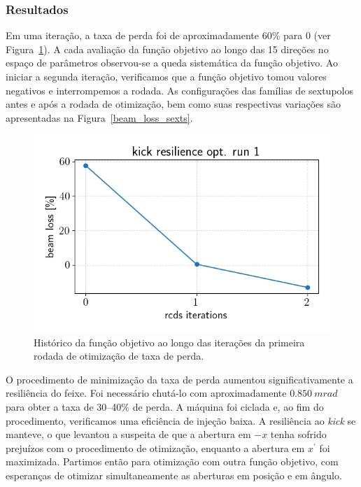 \documentclass[a4paper,
               keeplastbox,   %
               ]{jacow}
\begin{document}
\subsubsection{Resultados}
Em uma iteração, a taxa de perda foi de aproximadamente 60\% para 0 (ver Figura~\ref{beam_loss_hist}). A cada avaliação da função objetivo ao longo das 15 direções no espaço de parâmetros observou-se a queda sistemática da função objetivo. Ao iniciar a segunda iteração, verificamos que a função objetivo tomou valores negativos e interrompemos a rodada. As configurações das famílias de sextupolos antes e após a rodada de otimização, bem como suas respectivas variações são apresentadas na Figura~\ref{beam_loss_sexts}. 
\begin{figure}
    \centering
    \includegraphics[width=\columnwidth]{beam_loss_hist_run1.png}
    \caption{Histórico da função objetivo ao longo das iterações da primeira rodada de otimização de taxa de perda.}
    \label{beam_loss_hist}
\end{figure}

 O procedimento de minimização da taxa de perda aumentou significativamente a resiliência do feixe. Foi necessário chutá-lo com aproximadamente $0.850~\unit{m rad}$ para obter a taxa de 30--40\% de perda. A máquina foi ciclada e, ao fim do procedimento, verificamos uma eficiência de injeção baixa. A resiliência ao \textit{kick} se manteve, o que levantou  a suspeita de que a abertura em $-x$ tenha sofrido prejuízos com o procedimento de otimização, enquanto a abertura em $x^\prime$ foi maximizada. Partimos então para otimização com outra função objetivo, com esperanças de otimizar simultaneamente as aberturas em posição e em ângulo. 
\end{document}
